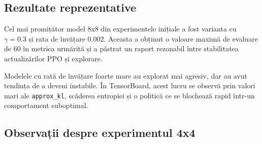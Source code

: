 \documentclass[12pt,a4paper]{article}
\begin{document}
\subsection{Rezultate reprezentative}

\begin{table}[H]
    \centering
    \caption{Rezumat al unor experimente reprezentative. Valorile sunt orientative și provin din rulările TensorBoard disponibile.}
    \label{tab:experiments}
\end{table}

Cel mai promițător model 8x8 din experimentele inițiale a fost varianta cu $\gamma=0.3$ și rata de învățare 0.002. Aceasta a obținut o valoare maximă de evaluare de 60 în metrica urmărită și a păstrat un raport rezonabil între stabilitatea actualizărilor PPO și explorare.

Modelele cu rată de învățare foarte mare au explorat mai agresiv, dar au avut tendința de a deveni instabile. În TensorBoard, acest lucru se observă prin valori mari ale \texttt{approx\_kl}, scăderea entropiei și o politică ce se blochează rapid într-un comportament suboptimal.

\subsection{Observații despre experimentul 4x4}
\end{document}
